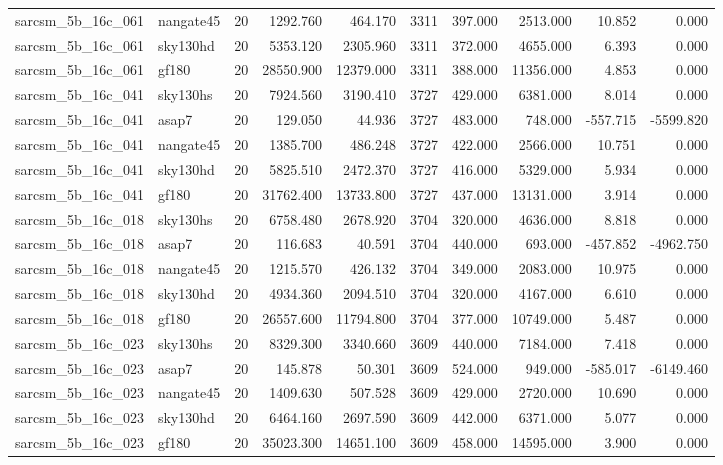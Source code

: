 \begin{longtable}{llrrrrrrrr}
sarcsm\_5b\_16c\_061 & nangate45 & 20 & 1292.760 & 464.170 & 3311 & 397.000 & 2513.000 & 10.852 & 0.000 \\
sarcsm\_5b\_16c\_061 & sky130hd & 20 & 5353.120 & 2305.960 & 3311 & 372.000 & 4655.000 & 6.393 & 0.000 \\
sarcsm\_5b\_16c\_061 & gf180 & 20 & 28550.900 & 12379.000 & 3311 & 388.000 & 11356.000 & 4.853 & 0.000 \\
sarcsm\_5b\_16c\_041 & sky130hs & 20 & 7924.560 & 3190.410 & 3727 & 429.000 & 6381.000 & 8.014 & 0.000 \\
sarcsm\_5b\_16c\_041 & asap7 & 20 & 129.050 & 44.936 & 3727 & 483.000 & 748.000 & -557.715 & -5599.820 \\
sarcsm\_5b\_16c\_041 & nangate45 & 20 & 1385.700 & 486.248 & 3727 & 422.000 & 2566.000 & 10.751 & 0.000 \\
sarcsm\_5b\_16c\_041 & sky130hd & 20 & 5825.510 & 2472.370 & 3727 & 416.000 & 5329.000 & 5.934 & 0.000 \\
sarcsm\_5b\_16c\_041 & gf180 & 20 & 31762.400 & 13733.800 & 3727 & 437.000 & 13131.000 & 3.914 & 0.000 \\
sarcsm\_5b\_16c\_018 & sky130hs & 20 & 6758.480 & 2678.920 & 3704 & 320.000 & 4636.000 & 8.818 & 0.000 \\
sarcsm\_5b\_16c\_018 & asap7 & 20 & 116.683 & 40.591 & 3704 & 440.000 & 693.000 & -457.852 & -4962.750 \\
sarcsm\_5b\_16c\_018 & nangate45 & 20 & 1215.570 & 426.132 & 3704 & 349.000 & 2083.000 & 10.975 & 0.000 \\
sarcsm\_5b\_16c\_018 & sky130hd & 20 & 4934.360 & 2094.510 & 3704 & 320.000 & 4167.000 & 6.610 & 0.000 \\
sarcsm\_5b\_16c\_018 & gf180 & 20 & 26557.600 & 11794.800 & 3704 & 377.000 & 10749.000 & 5.487 & 0.000 \\
sarcsm\_5b\_16c\_023 & sky130hs & 20 & 8329.300 & 3340.660 & 3609 & 440.000 & 7184.000 & 7.418 & 0.000 \\
sarcsm\_5b\_16c\_023 & asap7 & 20 & 145.878 & 50.301 & 3609 & 524.000 & 949.000 & -585.017 & -6149.460 \\
sarcsm\_5b\_16c\_023 & nangate45 & 20 & 1409.630 & 507.528 & 3609 & 429.000 & 2720.000 & 10.690 & 0.000 \\
sarcsm\_5b\_16c\_023 & sky130hd & 20 & 6464.160 & 2697.590 & 3609 & 442.000 & 6371.000 & 5.077 & 0.000 \\
sarcsm\_5b\_16c\_023 & gf180 & 20 & 35023.300 & 14651.100 & 3609 & 458.000 & 14595.000 & 3.900 & 0.000 \\

\end{longtable}
